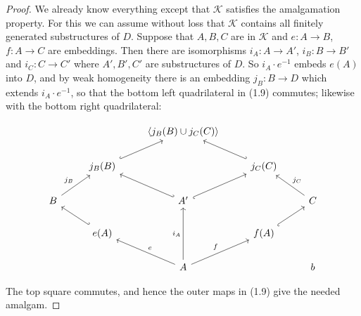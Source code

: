 \begin{proof}
    We already know everything except that \(\mathcal{K}\) satisfies the amalgamation property. For this we can assume without loss that \(\mathcal{K}\) contains all finitely generated substructures of \(D\). Suppose that \(A, B, C\) are in \(\mathcal{K}\) and \(e \colon A \to B\), \(f \colon A \to C\) are embeddings. Then there are isomorphisms \(i_A \colon A \to A'\), \(i_B \colon B \to B'\) and \(i_C \colon C \to C'\) where \(A', B', C'\) are substructures of \(D\). So \(i_A \cdot e^{-1}\) embeds \(e(A)\) into \(D\), and by weak homogeneity there is an embedding \(j_B \colon B \to D\) which extends \(i_A \cdot e^{-1}\), so that the bottom left quadrilateral in (1.9) commutes; likewise with the bottom right quadrilateral:


    \[
        \begin{tikzcd}
            & & \langle j_B(B)\cup j_C(C)\rangle & & \\
            & j_B(B)\arrow[ur,hook] & & j_C(C)\arrow[ul,hook'] & \\
            B\arrow[ur,"j_B"] & & A'\arrow[ul,hook']\arrow[ur,hook'] & & C\arrow[ul,"j_C"'] \\
            & e(A)\arrow[ul,hook'] & & f(A)\arrow[ur,hook'] & \\
            & & A\arrow[ul,"e"']\arrow[uu,"i_A"]\arrow[ur,"f"] & &b
        \end{tikzcd}
    \]



    The top square commutes, and hence the outer maps in (1.9) give the needed amalgam.
\end{proof}



